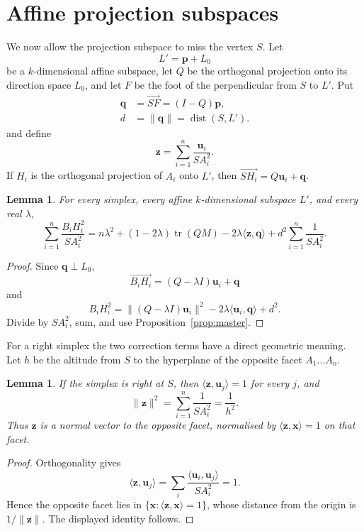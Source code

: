 \documentclass[11pt]{article}
\newtheorem{lemma}[theorem]{Lemma}
\theoremstyle{definition}
\theoremstyle{remark}
\DeclareMathOperator{\tr}{tr}
\DeclareMathOperator{\dist}{dist}
\newcommand{\bu}{\mathbf u}
\newcommand{\bz}{\mathbf z}
\newcommand{\bq}{\mathbf q}
\newcommand{\norm}[1]{\lVert #1 \rVert}
\begin{document}
\section{Affine projection subspaces}\label{sec:affine}

We now allow the projection subspace to miss the vertex $S$. Let
\[
L'=\mathbf p+L_0
\]
be a $k$-dimensional affine subspace, let $Q$ be the orthogonal projection onto its
direction space $L_0$, and let $F$ be the foot of the perpendicular from $S$ to $L'$. Put
\[
\begin{aligned}
\bq&=\overrightarrow{SF}=(I-Q)\mathbf p,\\
d&=\norm{\bq}=\dist(S,L').
\end{aligned}
\]
and define
\[
\bz=\sum_{i=1}^{n}\frac{\bu_i}{SA_i^2}.
\]
If $H_i$ is the orthogonal projection of $A_i$ onto $L'$, then
$\overrightarrow{SH_i}=Q\bu_i+\bq$.

\begin{lemma}\label{lem:affinegeneral}
For every simplex, every affine $k$-dimensional subspace $L'$, and every real $\lambda$,
\begin{equation}\label{eq:affinegeneral}
\sum_{i=1}^{n}\frac{B_iH_i^2}{SA_i^2}
=
n\lambda^2+(1-2\lambda)\tr(QM)
-2\lambda\langle\bz,\bq\rangle
+d^2\sum_{i=1}^{n}\frac1{SA_i^2}.
\end{equation}
\end{lemma}

\begin{proof}
Since $\bq\perp L_0$,
\[
\overrightarrow{B_iH_i}=(Q-\lambda I)\bu_i+\bq
\]
and
\[
B_iH_i^2
=
\norm{(Q-\lambda I)\bu_i}^2
-2\lambda\langle\bu_i,\bq\rangle+d^2.
\]
Divide by $SA_i^2$, sum, and use Proposition~\ref{prop:master}.
\end{proof}

For a right simplex the two correction terms have a direct geometric meaning. Let $h$ be
the altitude from $S$ to the hyperplane of the opposite facet $A_1\ldots A_n$.

\begin{lemma}\label{lem:altitude}
If the simplex is right at $S$, then $\langle\bz,\bu_j\rangle=1$ for every $j$, and
\[
\norm{\bz}^2=\sum_{i=1}^{n}\frac1{SA_i^2}=\frac1{h^2}.
\]
Thus $\bz$ is a normal vector to the opposite facet, normalised by
$\langle\bz,\mathbf x\rangle=1$ on that facet.
\end{lemma}

\begin{proof}
Orthogonality gives
\[
\langle\bz,\bu_j\rangle
=
\sum_i\frac{\langle\bu_i,\bu_j\rangle}{SA_i^2}=1.
\]
Hence the opposite facet lies in $\{\mathbf x:\langle\bz,\mathbf x\rangle=1\}$, whose
distance from the origin is $1/\norm\bz$. The displayed identity follows.
\end{proof}
\end{document}
